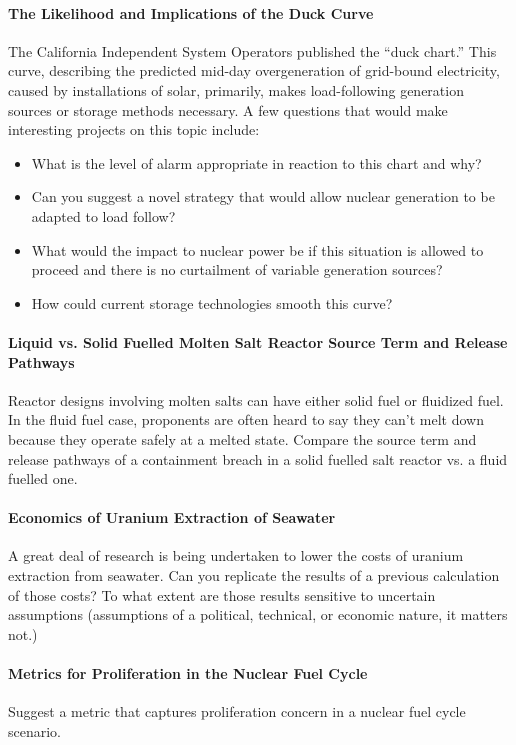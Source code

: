 \documentclass[12pts, answers]{exam}
\begin{document}
\paragraph{The Likelihood and Implications of the Duck Curve} The California
Independent System Operators published the ``duck chart.'' This curve,
describing the predicted mid-day overgeneration of grid-bound electricity,
caused by installations of solar, primarily, makes load-following generation
sources or storage methods necessary. A few questions that would make
interesting projects on this topic include:
\begin{itemize}
\item What is the level of alarm appropriate in reaction to this chart and why?
\item Can you suggest a novel strategy that would allow nuclear generation to
be adapted to load follow?
\item What would the impact to nuclear power be if this situation is allowed to
proceed and there is no curtailment of variable generation sources?
\item How could current storage technologies smooth this curve?
\end{itemize}

\paragraph{Liquid vs. Solid Fuelled Molten Salt Reactor Source Term and Release
Pathways} Reactor designs involving molten salts can have either solid fuel or
fluidized fuel. In the fluid fuel case, proponents are often heard to say they
can't melt down because they operate safely at a melted state. Compare the
source term and release pathways of a containment breach in a solid fuelled
salt reactor vs. a fluid fuelled one.

\paragraph{Economics of Uranium Extraction of Seawater} A great deal of
research is being undertaken to lower the costs of uranium extraction from
seawater. Can you replicate the results of a previous calculation of those
costs? To what extent are those results sensitive to uncertain assumptions
(assumptions of a political, technical, or economic nature, it matters not.)

\paragraph{Metrics for Proliferation in the Nuclear Fuel Cycle} Suggest a
metric that captures proliferation concern in a nuclear fuel cycle scenario.
\end{document}
